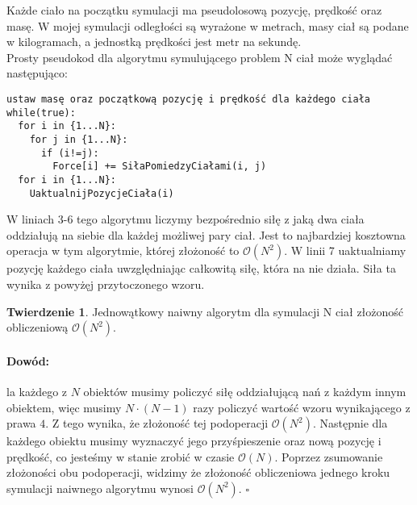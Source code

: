 \documentclass[14pt,twoside,a4paper]{article}
\newenvironment{myproof}[2] {\paragraph{Dowód:}}{\hfill$\square$}
\newcommand\tab[1][1cm]{\hspace*{#1}}
\theoremstyle{definition}
\begin{document}
Każde ciało na początku symulacji ma pseudolosową pozycję, prędkość oraz masę. W mojej symulacji odległości są wyrażone w metrach, masy ciał są podane w kilogramach, a jednostką prędkości jest metr na sekundę. \\


Prosty pseudokod dla algorytmu symulującego problem N ciał może wyglądać następująco:\\
\bigskip
{}
\begin{lstlisting}[frame=single, framerule=2pt, caption=Pseudokod naiwnego algorytmu]
ustaw masę oraz początkową pozycję i prędkość dla każdego ciała
while(true):
  for i in {1...N}:
    for j in {1...N}:
      if (i!=j):
        Force[i] += SiłaPomiedzyCiałami(i, j) 
  for i in {1...N}:
    UaktualnijPozycjeCiała(i)
\end{lstlisting}

\bigskip

W liniach 3-6 tego algorytmu liczymy bezpośrednio siłę z jaką dwa ciała oddziałują na siebie dla każdej możliwej pary ciał. Jest to najbardziej kosztowna operacja w tym algorytmie, której złożoność to $\mathcal{O}(N^{2})$. W linii 7 uaktualniamy pozycję każdego ciała uwzględniając całkowitą siłę, która na nie działa. Siła ta wynika z powyżęj przytoczonego wzoru. 
\bigskip
\newtheorem{twr}{Twierdzenie}
\begin{twr}
Jednowątkowy naiwny algorytm dla symulacji N ciał złożoność obliczeniową $\mathcal{O}(N^{2})$.
\end{twr}

\begin{myproof}

\tab Dla każdego z $N$ obiektów musimy policzyć siłę oddziałującą nań z każdym innym obiektem, więc musimy $N\cdot (N-1)$ razy policzyć wartość wzoru wynikającego z prawa $4$. Z tego wynika, że złożoność tej podoperacji $\mathcal{O}(N^{2})$. 
Następnie dla każdego obiektu musimy wyznaczyć jego przyśpieszenie oraz nową pozycję i prędkość, co jesteśmy w stanie zrobić w czasie $\mathcal{O}(N)$.
Poprzez zsumowanie złożoności obu podoperacji, widzimy że złożoność obliczeniowa jednego kroku symulacji naiwnego algorytmu wynosi $\mathcal{O}(N^{2})$.
\end{myproof}
\end{document}
